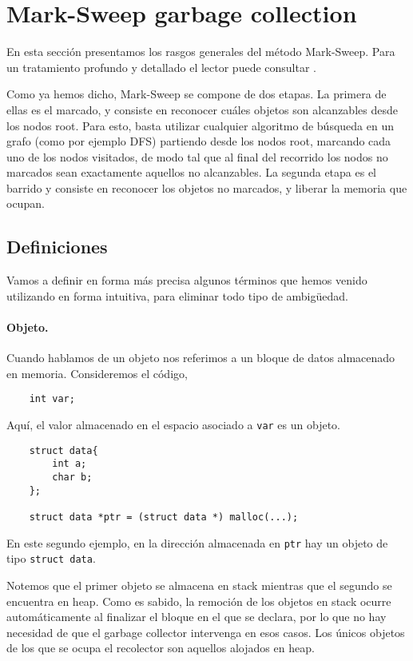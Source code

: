 \section{Mark-Sweep garbage collection}
En esta sección presentamos los rasgos generales del método Mark-Sweep. Para un tratamiento profundo y detallado el lector puede consultar \cite{jones96}.

Como ya hemos dicho, Mark-Sweep se compone de dos etapas. La primera de ellas es el marcado, y consiste en reconocer cuáles objetos son alcanzables desde los nodos root. Para esto, basta utilizar cualquier algoritmo de búsqueda en un grafo (como por ejemplo DFS) partiendo desde los nodos root, marcando cada uno de los nodos visitados, de modo tal que al final del recorrido los nodos no marcados sean exactamente aquellos no alcanzables. La segunda etapa es el barrido y consiste en reconocer los objetos no marcados, y liberar la memoria que ocupan.

\subsection{Definiciones}
Vamos a definir en forma más precisa algunos términos que hemos venido utilizando en forma intuitiva, para eliminar todo tipo de ambigüedad.

\paragraph*{Objeto.} Cuando hablamos de un objeto nos referimos a un bloque de datos almacenado en memoria. Consideremos el código,

\begin{verbatim}
    int var;
\end{verbatim}

Aquí, el valor almacenado en el espacio asociado a \texttt{var} es un objeto.

\begin{verbatim}
    struct data{
        int a;
        char b;
    };
    
    struct data *ptr = (struct data *) malloc(...);
\end{verbatim}

En este segundo ejemplo, en la dirección almacenada en \texttt{ptr} hay un objeto de tipo \texttt{struct data}.

Notemos que el primer objeto se almacena en stack mientras que el segundo se encuentra en heap. Como es sabido, la remoción de los objetos en stack ocurre automáticamente al finalizar el bloque en el que se declara, por lo que no hay necesidad de que el garbage collector intervenga en esos casos. Los únicos objetos de los que se ocupa el recolector son aquellos alojados en heap.

